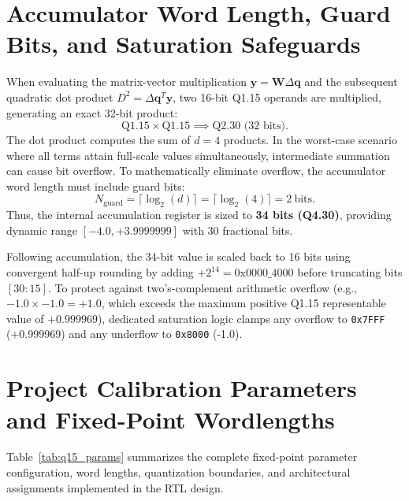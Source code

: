 \documentclass[11pt,a4paper]{report}
\begin{document}
\section{Accumulator Word Length, Guard Bits, and Saturation Safeguards}
When evaluating the matrix-vector multiplication $\boldsymbol{y} = \boldsymbol{W} \Delta\boldsymbol{q}$
and the subsequent quadratic dot product $D^2 = \Delta\boldsymbol{q}^T \boldsymbol{y}$, two 16-bit
Q1.15 operands are multiplied, generating an exact 32-bit product:
\begin{equation}
\text{Q1.15} \times \text{Q1.15} \implies \text{Q2.30 (32 bits)}.
\end{equation}
The dot product computes the sum of $d = 4$ products. In the worst-case scenario where all
terms attain full-scale values simultaneously, intermediate summation can cause bit overflow.
To mathematically eliminate overflow, the accumulator word length must include guard bits:
\begin{equation}
N_{\text{guard}} = \lceil \log_2(d) \rceil = \lceil \log_2(4) \rceil = 2~\text{bits}.
\end{equation}
Thus, the internal accumulation register is sized to \textbf{34 bits (Q4.30)}, providing
dynamic range $[-4.0, +3.9999999]$ with 30 fractional bits.

Following accumulation, the 34-bit value is scaled back to 16 bits using convergent half-up
rounding by adding $+2^{14} = \text{0x0000\_4000}$ before truncating bits $[30:15]$. To protect
against two's-complement arithmetic overflow (e.g., $-1.0 \times -1.0 = +1.0$, which exceeds
the maximum positive Q1.15 representable value of $+0.999969$), dedicated saturation logic
clamps any overflow to \texttt{0x7FFF} (+0.999969) and any underflow to \texttt{0x8000} (-1.0).

\section{Project Calibration Parameters and Fixed-Point Wordlengths}
Table~\ref{tab:q15_params} summarizes the complete fixed-point parameter configuration,
word lengths, quantization boundaries, and architectural assignments implemented in the
RTL design.
\end{document}
